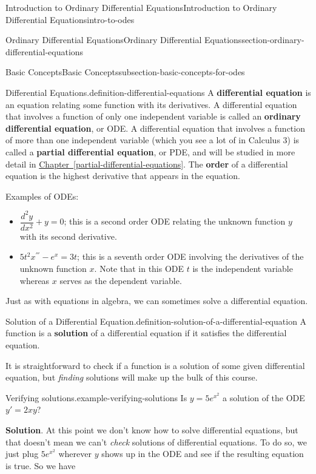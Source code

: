 \documentclass[oneside,10pt,]{book}
\newcommand{\terminology}[1]{\textbf{#1}}
\numberwithin{equation}{section}
\newcommand{\dv}[3][]{\dfrac{d^{#1} #2}{d #3^{#1}}}
\begin{document}
\begin{chapterptx}{Introduction to Ordinary Differential Equations}{}{Introduction to Ordinary Differential Equations}{}{}{intro-to-odes}
\begin{sectionptx}{Ordinary Differential Equations}{}{Ordinary Differential Equations}{}{}{section-ordinary-differential-equations}
\begin{subsectionptx}{Basic Concepts}{}{Basic Concepts}{}{}{subsection-basic-concepts-for-odes}
\begin{definition}{Differential Equations.}{definition-differential-equations}
A \terminology{differential equation} is an equation relating some function with its derivatives. A differential equation that involves a function of only one independent variable is called an \terminology{ordinary differential equation}, or ODE. A differential equation that involves a function of more than one independent variable (which you see a lot of in Calculus 3) is called a \terminology{partial differential equation}, or PDE, and will be studied in more detail in \hyperref[partial-differential-equations]{Chapter~\ref{partial-differential-equations}}. The \terminology{order} of a differential equation is the highest derivative that appears in the equation.%
\end{definition}
\hypertarget{p-6}{}%
Examples of ODEs:\leavevmode%
\begin{itemize}[label=\textbullet]
\item{}\hypertarget{p-7}{}%
\(\dv[2]{y}{x} + y = 0\); this is a second order ODE relating the unknown function \(y\) with its second derivative.%
\item{}\hypertarget{p-8}{}%
\(5t^{2}x^{'''} - e^{x} = 3t\); this is a seventh order ODE involving the derivatives of the unknown function \(x\). Note that in this ODE \(t\) is the independent variable whereas \(x\) serves as the dependent variable.%
\end{itemize}
%
\par
\hypertarget{p-9}{}%
Just as with equations in algebra, we can sometimes solve a differential equation.%
\begin{definition}{Solution of a Differential Equation.}{definition-solution-of-a-differential-equation}%
\hypertarget{p-10}{}%
A function is a \terminology{solution} of a differential equation if it satisfies the differential equation.%
\end{definition}
\hypertarget{p-11}{}%
It is straightforward to check if a function is a solution of some given differential equation, but \emph{finding} solutions will make up the bulk of this course.%
\begin{example}{Verifying solutions.}{example-verifying-solutions}%
\hypertarget{p-12}{}%
Is \(y = 5e^{x^{2}}\) a solution of the ODE \(y' = 2xy\)?%
\par\smallskip%
\noindent\textbf{Solution}.\hypertarget{solution-1}{}\quad%
\hypertarget{p-13}{}%
At this point we don't know how to solve differential equations, but that doesn't mean we can't \emph{check} solutions of differential equations. To do so, we just plug \(5e^{x^{2}}\) wherever \(y\) shows up in the ODE and see if the resulting equation is true. So we have%

\end{example}
\end{subsectionptx}
\end{sectionptx}
\end{chapterptx}
\end{document}
